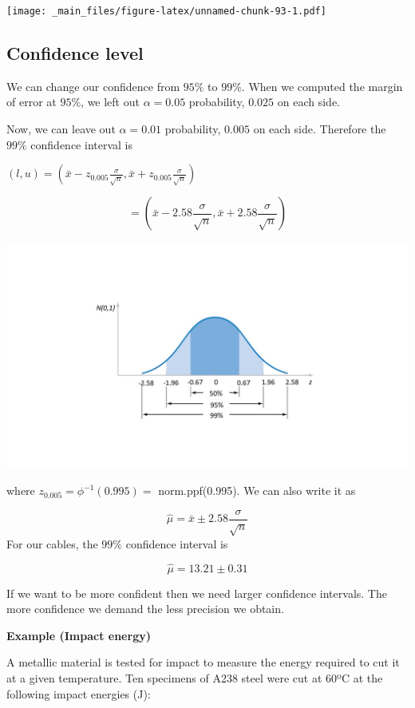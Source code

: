 \documentclass[
]{book}
\begin{document}
\texttt{[image: \_main\_files/figure-latex/unnamed-chunk-93-1.pdf]}

\hypertarget{confidence-level}{%
\subsection{Confidence level}\label{confidence-level}}

We can change our confidence from \(95\%\) to \(99\%\). When we computed the margin of error at \(95\%\), we left out \(\alpha=0.05\) probability, \(0.025\) on each side.

Now, we can leave out \(\alpha=0.01\) probability, \(0.005\) on each side. Therefore the \(99\%\) confidence interval is

\((l,u) = (\bar{x} - z_{0.005}\frac{\sigma}{\sqrt{n}},\bar{x} + z_{0.005}\frac{\sigma}{\sqrt{n}})\)

\[= (\bar{x} - 2.58\frac{\sigma}{\sqrt{n}},\bar{x} + 2.58\frac{\sigma}{\sqrt{n}})\]

\includegraphics{./figures/phi.JPG}

where \(z_{0.005}=\phi^{-1}(0.995)=\) norm.ppf(0.995). We can also write it as

\[\hat{\mu}=\bar{x} \pm 2.58\frac{\sigma}{\sqrt{n}}\]
For our cables, the \(99\%\) confidence interval is

\[\hat{\mu}= 13.21 \pm 0.31\]

If we want to be more confident then we need larger confidence intervals. The more confidence we demand the less precision we obtain.

\textbf{Example (Impact energy)}

A metallic material is tested for impact to measure the energy required to cut it at a given temperature. Ten specimens of A238 steel were cut at 60ºC at the following impact energies (J):
\end{document}
